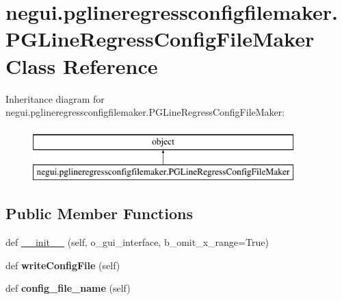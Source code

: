 \hypertarget{classnegui_1_1pglineregressconfigfilemaker_1_1PGLineRegressConfigFileMaker}{}\section{negui.\+pglineregressconfigfilemaker.\+P\+G\+Line\+Regress\+Config\+File\+Maker Class Reference}
\label{classnegui_1_1pglineregressconfigfilemaker_1_1PGLineRegressConfigFileMaker}
Inheritance diagram for negui.\+pglineregressconfigfilemaker.\+P\+G\+Line\+Regress\+Config\+File\+Maker\+:\begin{figure}[H]
\begin{center}
\leavevmode
\includegraphics[height=2.000000cm]{classnegui_1_1pglineregressconfigfilemaker_1_1PGLineRegressConfigFileMaker}
\end{center}
\end{figure}
\subsection*{Public Member Functions}
\begin{DoxyCompactItemize}
\item 
def \hyperlink{classnegui_1_1pglineregressconfigfilemaker_1_1PGLineRegressConfigFileMaker_af78281613cc8b1b2d0d95be32c4138f1}{\+\_\+\+\_\+init\+\_\+\+\_\+} (self, o\+\_\+gui\+\_\+interface, b\+\_\+omit\+\_\+x\+\_\+range=True)
\item 
def {\bfseries write\+Config\+File} (self)\hypertarget{classnegui_1_1pglineregressconfigfilemaker_1_1PGLineRegressConfigFileMaker_a5cf14507bb3450762c709206466b57aa}{}\label{classnegui_1_1pglineregressconfigfilemaker_1_1PGLineRegressConfigFileMaker_a5cf14507bb3450762c709206466b57aa}

\item 
def {\bfseries config\+\_\+file\+\_\+name} (self)\hypertarget{classnegui_1_1pglineregressconfigfilemaker_1_1PGLineRegressConfigFileMaker_a9da0b11fd6058b928117fdc75d008342}{}\label{classnegui_1_1pglineregressconfigfilemaker_1_1PGLineRegressConfigFileMaker_a9da0b11fd6058b928117fdc75d008342}

\end{DoxyCompactItemize}
